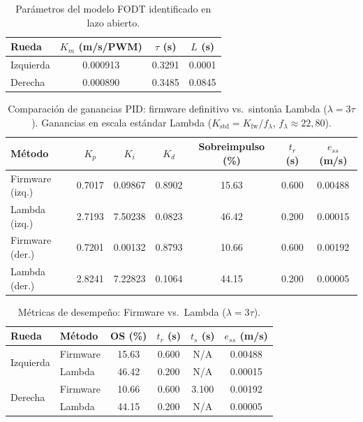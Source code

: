 
\begin{table}[H]
\centering
\caption{Par\'{a}metros del modelo FODT identificado en lazo abierto.}
\label{tab:fodt_lambda}
\begin{tabular}{lccc}
\hline
\textbf{Rueda} & $K_m$ \textbf{(m/s/PWM)} & $\tau$ \textbf{(s)} & $L$ \textbf{(s)} \\
\hline
Izquierda & 0.000913 & 0.3291 & 0.0001 \\
Derecha & 0.000890 & 0.3485 & 0.0845 \\
\hline
\end{tabular}
\end{table}

\begin{table}[H]
\centering
\caption{Comparaci\'{{o}}n de ganancias PID: firmware definitivo vs.\ sinton\'{{\i}}a Lambda ($\lambda = 3\tau$). Ganancias en escala est\'{{a}}ndar Lambda ($K_{{\mathrm{{std}}}}=K_{{\mathrm{{fw}}}}/f_\lambda$, $f_\lambda\approx 22{,}80$).}
\label{tab:comparacion_metodos}
\footnotesize
\begin{tabular}{lcccccc}
\hline
\textbf{M\'{e}todo} & $K_p$ & $K_i$ & $K_d$ & \textbf{Sobreimpulso (\%)} & \textbf{$t_r$ (s)} & \textbf{$e_{ss}$ (m/s)} \\
\hline
Firmware (izq.) & 0.7017 & 0.09867 & 0.8902 & 15.63 & 0.600 & 0.00488 \\
Lambda (izq.) & 2.7193 & 7.50238 & 0.0823 & 46.42 & 0.200 & 0.00015 \\
\hline
Firmware (der.) & 0.7201 & 0.00132 & 0.8793 & 10.66 & 0.600 & 0.00192 \\
Lambda (der.) & 2.8241 & 7.22823 & 0.1064 & 44.15 & 0.200 & 0.00005 \\
\hline
\end{tabular}
\end{table}

\begin{table}[H]
\centering
\caption{M\'{e}tricas de desempe\~{n}o: Firmware vs.\ Lambda ($\lambda=3\tau$).}
\label{tab:metricas_comparacion}
\begin{tabular}{llcccc}
\hline
\textbf{Rueda} & \textbf{M\'{e}todo} & \textbf{OS (\%)} & \textbf{$t_r$ (s)} & \textbf{$t_s$ (s)} & \textbf{$e_{ss}$ (m/s)} \\
\hline
\multirow{2}{*}{Izquierda} & Firmware & 15.63 & 0.600 & N/A & 0.00488 \\
 & Lambda & 46.42 & 0.200 & N/A & 0.00015 \\
\hline
\multirow{2}{*}{Derecha} & Firmware & 10.66 & 0.600 & 3.100 & 0.00192 \\
 & Lambda & 44.15 & 0.200 & N/A & 0.00005 \\
\hline
\end{tabular}
\end{table}

